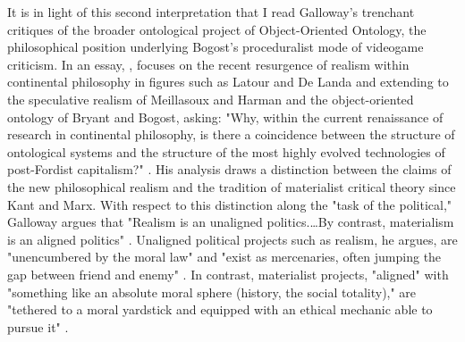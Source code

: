 It is in light of this second interpretation that I read Galloway's trenchant critiques of the broader ontological project of Object-Oriented Ontology, the philosophical position underlying Bogost's proceduralist mode of videogame criticism. In an essay, , \citeauthor{Galloway2013-ht} focuses on the recent resurgence of realism within continental philosophy in figures such as Latour and De Landa and extending to the speculative realism of Meillasoux and Harman and the object-oriented ontology of Bryant and Bogost, asking: "Why, within the current renaissance of research in continental philosophy, is there a coincidence between the structure of ontological systems and the structure of the most highly evolved technologies of post-Fordist capitalism?" \autocite[347]{Galloway2013-ht}. His analysis draws a distinction between the claims of the new philosophical realism and the tradition of materialist critical theory since Kant and Marx. With respect to this distinction along the "task of the political," Galloway argues that "Realism is an unaligned politics.…By contrast, materialism is an aligned politics" \autocite[365--6]{Galloway2013-ht}. Unaligned political projects such as realism, he argues, are "unencumbered by the moral law" and "exist as mercenaries, often jumping the gap between friend and enemy" \autocite[365]{Galloway2013-ht}. In contrast, materialist projects, "aligned" with "something like an absolute moral sphere (history, the social totality)," are "tethered to a moral yardstick and equipped with an ethical mechanic able to pursue it" \autocite[365-6]{Galloway2013-ht}.

